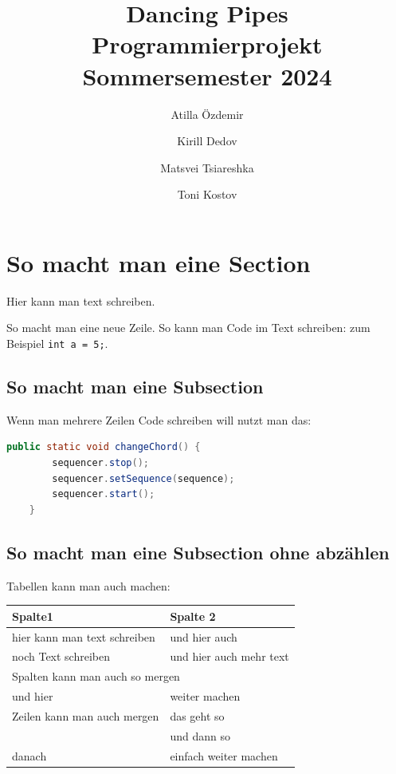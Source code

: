 \documentclass[]{article}
\title{ \textbf{Dancing Pipes} \vspace{2em} \\ Programmierprojekt \\ Sommersemester 2024}
\author{ Atilla Özdemir \and Kirill Dedov \and Matsvei Tsiareshka \and Toni Kostov}
\begin{document}
\maketitle
 \thispagestyle{empty}
\newpage

\setcounter{page}{1}

\section{So macht man eine Section}
Hier kann man text schreiben.

So macht man eine neue Zeile.
So kann man Code im Text schreiben: zum Beispiel \texttt{int a = 5;}.

\subsection{So macht man eine Subsection}

Wenn man mehrere Zeilen Code schreiben will nutzt man das:

\begin{lstlisting}[language=Java]
	public static void changeChord() {
		sequencer.stop();
		sequencer.setSequence(sequence);
		sequencer.start();
	}
\end{lstlisting}

\subsection*{So macht man eine Subsection ohne abzählen}
Tabellen kann man auch machen:
\begin{center}
	\begin{longtable}{|l|l|}
		\textbf{Spalte1} & 
		\textbf{Spalte 2} \\
		\hline
		
		hier kann man text schreiben & und hier auch \\
		\hline
		
		noch Text schreiben & 
		und hier auch mehr text  \\
		\hline
		
		\multicolumn{2}{|l|}{Spalten kann man auch so mergen} \\
		\hline
		
		und hier & weiter machen \\
		\hline
		\hline
		
		\multirow[c]{1}{*}{Zeilen kann man auch mergen} & das geht so  \\
	
		& und dann so \\ 
		\hline
		
		danach & einfach weiter machen \\
		\hline
		
	\end{longtable}
\end{center}
\end{document}
